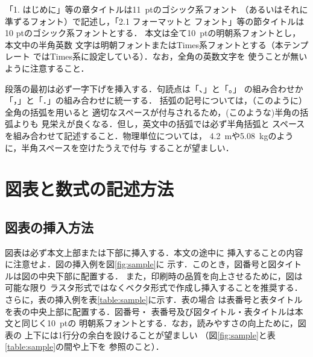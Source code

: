 \documentclass[a4j]{jsarticle}
\begin{document}
「1. はじめに」等の章タイトルは11~ptのゴシック系フォント
（あるいはそれに準ずるフォント）で記述し，「2.1 フォーマットと
フォント」等の節タイトルは10 ptのゴシック系フォントとする．
本文は全て10~ptの明朝系フォントとし，本文中の半角英数
文字は明朝フォントまたはTimes系フォントとする（本テンプレート
ではTimes系に設定している）．なお，全角の英数文字を
使うことが無いように注意すること．

段落の最初は必ず一字下げを挿入する．句読点は「、」と「。」
の組み合わせか「，」と「．」の組み合わせに統一する．
括弧の記号については，（このように）全角の括弧を用いると
適切なスペースが付与されるため，(このような)半角の括弧よりも
見栄えが良くなる．但し，英文中の括弧では必ず半角括弧と
スペースを組み合わせて記述すること．物理単位については，
4.2~mや5.08~kgのように，半角スペースを空けたうえで付与
することが望ましい．

\section{図表と数式の記述方法}

\subsection{図表の挿入方法}

図表は必ず本文上部または下部に挿入する．本文の途中に
挿入することの内容に注意せよ．図の挿入例を図\ref{fig:sample}に
示す．このとき，図番号と図タイトルは図の中央下部に配置する．
また，印刷時の品質を向上させるために，図は可能な限り
ラスタ形式ではなくベクタ形式で作成し挿入することを推奨する．
さらに，表の挿入例を表\ref{table:sample}に示す．表の場合
は表番号と表タイトルを表の中央上部に配置する．図番号・
表番号及び図タイトル・表タイトルは本文と同じく10~ptの
明朝系フォントとする．なお，読みやすさの向上ために，図表の
上下には1行分の余白を設けることが望ましい
（図\ref{fig:sample}と表\ref{table:sample}の間や上下を
参照のこと）．
\end{document}
